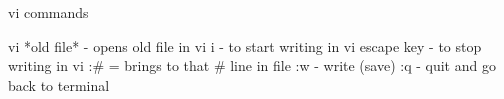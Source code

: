 vi commands

vi *old file* - opens old file in vi
i - to start writing in vi
escape key - to stop writing in vi
:# = brings to that # line in file
:w - write (save)
:q - quit and go back to terminal

